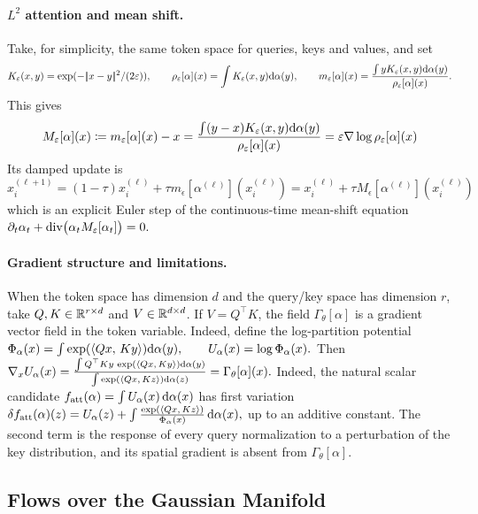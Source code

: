 \paragraph{\texorpdfstring{$L^2$ attention and mean shift.}{L^2 attention and mean shift.}}
Take, for simplicity, the same token space for queries, keys and values, and set
\[
K_\varepsilon(x,y)=\exp(-|\!| x-y |\!|^2/(2\varepsilon)),
\qquad
\rho_\varepsilon[\alpha](x)=\int K_\varepsilon(x,y)\mathrm{d}\alpha(y),
\qquad
m_\varepsilon[\alpha](x)
=
\frac{\int yK_\varepsilon(x,y)\mathrm{d}\alpha(y)}
{\rho_\varepsilon[\alpha](x)}.
\]
This gives
\begin{equation}\label{eq-l2-attention-mean-shift}
M_\varepsilon[\alpha](x)
\coloneqq
m_\varepsilon[\alpha](x)-x
=
\frac{\int (y-x)K_\varepsilon(x,y)\mathrm{d}\alpha(y)}
{\rho_\varepsilon[\alpha](x)}
=
\varepsilon\nabla\log\rho_\varepsilon[\alpha](x)
\end{equation}
Its damped update is
\[
x_i^{(\ell+1)}
=
(1-\tau)x_i^{(\ell)}+\tau m_\epsilon[\alpha^{(\ell)}](x_i^{(\ell)})
=
x_i^{(\ell)}+\tau M_\epsilon[\alpha^{(\ell)}](x_i^{(\ell)})
\]
which is an explicit Euler step of the continuous-time mean-shift equation
\(\partial_t\alpha_t+\operatorname{div}\bigl(\alpha_tM_\varepsilon[\alpha_t]\bigr)=0.\)
\paragraph{Gradient structure and limitations.}
When the token space has dimension $d$ and the query/key space has dimension $r$, take $Q,K\in\mathbb{R}^{r\times d}$ and $V\in\mathbb{R}^{d\times d}$. If $V=Q^\top K$, the field $\Gamma_\theta[\alpha]$ is a gradient vector field in the token variable. Indeed, define the log-partition potential
\(\Phi_\alpha(x) = \int \exp(\langle Qx,\,Ky\rangle)\mathrm{d}\alpha(y), \qquad U_\alpha(x)=\log\Phi_\alpha(x).\)
Then
\(\nabla_x U_\alpha(x) = \frac{\int Q^\top K y\,\exp(\langle Qx,\,Ky\rangle)\mathrm{d}\alpha(y)} {\int \exp(\langle Qx,\,Kz\rangle)\mathrm{d}\alpha(z)} = \Gamma_\theta[\alpha](x).\)
Indeed, the natural scalar candidate $f_{\rm att}(\alpha)=\int U_\alpha(x)\,\mathrm{d}\alpha(x)$ has first variation
\(\delta f_{\rm att}(\alpha)(z) = U_\alpha(z) + \int \frac{\exp(\langle Qx,\,Kz\rangle)}{\Phi_\alpha(x)} \,\mathrm{d}\alpha(x),\)
up to an additive constant. The second term is the response of every query normalization to a perturbation of the key distribution, and its spatial gradient is absent from $\Gamma_\theta[\alpha]$.

\subsection{Flows over the Gaussian Manifold}
\label{sec-gaussian-closure-transport-dynamics}
